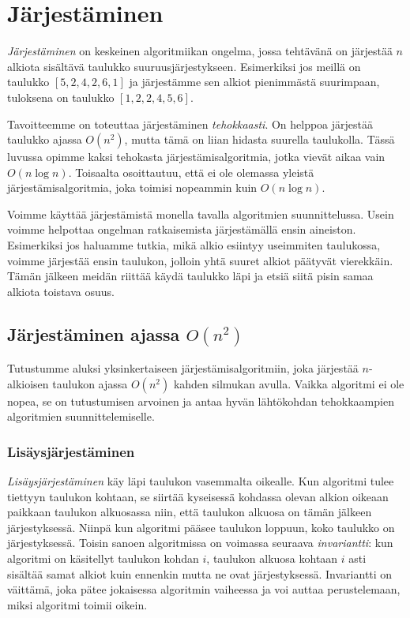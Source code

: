 \chapter{Järjestäminen}


\emph{Järjestäminen} on keskeinen algoritmiikan ongelma,
jossa tehtävänä on jär\-jestää $n$ alkiota sisältävä
taulukko suuruusjärjestykseen.
Esimerkiksi jos meil\-lä on taulukko $[5,2,4,2,6,1]$ ja
järjestämme sen alkiot pienimmästä suurimpaan,
tuloksena on taulukko $[1,2,2,4,5,6]$.

Tavoitteemme on toteuttaa järjestäminen
\emph{tehokkaasti}.
On helppoa järjes\-tää taulukko ajassa $O(n^2)$,
mutta tämä on liian hidasta suurella taulukolla.
Tässä luvussa opimme kaksi tehokasta
järjestämisalgoritmia, jotka vievät aikaa vain $O(n \log n)$.
Toisaalta osoittautuu, että ei ole olemassa
yleistä järjestämisalgoritmia, joka toimisi nopeammin
kuin $O(n \log n)$.

Voimme käyttää järjestämistä monella tavalla
algoritmien suunnittelussa.
Usein voimme helpottaa ongelman ratkaisemista
järjestämällä ensin aineiston.
Esimerkiksi jos haluamme tutkia,
mikä alkio esiintyy useimmiten taulukossa,
voimme järjestää ensin taulukon,
jolloin yhtä suuret alkiot päätyvät vierekkäin.
Tämän jälkeen meidän riittää käydä taulukko läpi
ja etsiä siitä pisin samaa alkiota toistava osuus.

\section{Järjestäminen ajassa $O(n^2)$}


Tutustumme aluksi yksinkertaiseen järjestämisalgoritmiin,
joka järjestää $n$-alkioisen taulukon ajassa $O(n^2)$ kahden silmukan avulla.
Vaikka algoritmi ei ole nopea, se on tutustumisen arvoinen
ja antaa hyvän lähtökohdan tehokkaampien algoritmien
suunnittelemiselle.

\subsection{Lisäysjärjestäminen}


\emph{Lisäysjärjestäminen} käy läpi taulukon
vasemmalta oikealle.
Kun algoritmi tulee tiettyyn taulukon kohtaan,
se siirtää kyseisessä kohdassa olevan alkion
oikeaan paikkaan taulukon
alkuosassa niin, että taulukon alkuosa
on tämän jälkeen järjestyksessä.
Niinpä kun algoritmi pääsee taulukon loppuun,
koko taulukko on järjestyksessä.
Toisin sanoen algoritmissa on voimassa
seuraava \emph{invariantti}:
kun algoritmi on käsitellyt taulukon kohdan $i$,
taulukon alkuosa kohtaan $i$ asti sisältää
samat alkiot kuin ennenkin mutta ne ovat järjestyksessä.
Invariantti on väittämä, joka pätee jokaisessa
algoritmin vaiheessa ja voi auttaa perustelemaan,
miksi algoritmi toimii oikein.

